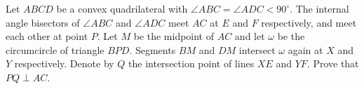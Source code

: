Let 
$ABCD$
 be a convex quadrilateral with 
$\angle ABC = \angle ADC < 90^{\circ}$. 
 The internal angle bisectors of 
$\angle ABC$
 and 
$\angle ADC$
 meet 
$AC$
 at 
$E$
 and 
$F$
 respectively, and meet each other at point 
$P$. 
 Let 
$M$
 be the midpoint of 
$AC$
 and let 
$\omega$
 be the circumcircle of triangle 
$BPD$. 
 Segments 
$BM$
 and 
$DM$
 intersect 
$\omega$
 again at 
$X$
 and 
$Y$
 respectively. Denote by 
$Q$
 the intersection point of lines 
$XE$
 and 
$YF$. 
 Prove that 
$PQ \perp AC$. 
